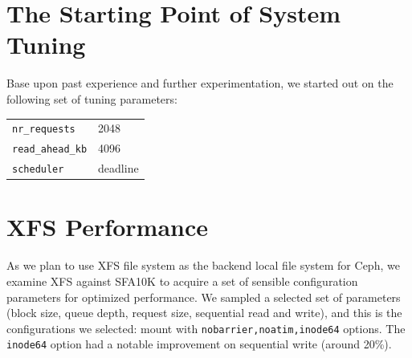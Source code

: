 \documentclass{article}
\begin{document}
\section{The Starting Point of System Tuning}

Base upon past experience and further experimentation, we started out on the
following set of tuning parameters:

\begin{table}[htb]
\centering
\begin{tabular}{ll}
    \toprule
    \verb!nr_requests! & 2048 \\
    \verb!read_ahead_kb! & 4096 \\
    \verb!scheduler! & deadline \\
    \bottomrule
\end{tabular}

\end{table}



\section{XFS Performance}

As we plan to use XFS file system as the backend local file system for Ceph, we
examine XFS against SFA10K to acquire a set of sensible configuration parameters
for optimized performance. We sampled a selected set of parameters (block size,
queue depth, request size, sequential read and write), and this is the
configurations we selected: mount with \verb!nobarrier,noatim,inode64! options.
The \verb!inode64! option had a notable improvement on sequential write (around
20\%).
\end{document}
